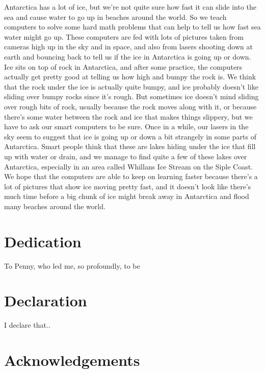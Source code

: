 \documentclass[12pt,twoside]{book}
\begin{document}
Antarctica has a lot of ice, but we're not quite sure how fast it can slide into the sea and cause water to go up in beaches around the world.
So we teach computers to solve some hard math problems that can help to tell us how fast sea water might go up.
These computers are fed with lots of pictures taken from cameras high up in the sky and in space, and also from lasers shooting down at earth and bouncing back to tell us if the ice in Antarctica is going up or down.
Ice sits on top of rock in Antarctica, and after some practice, the computers actually get pretty good at telling us how high and bumpy the rock is.
We think that the rock under the ice is actually quite bumpy, and ice probably doesn't like sliding over bumpy rocks since it's rough.
But sometimes ice doesn't mind sliding over rough bits of rock, usually because the rock moves along with it, or because there's some water between the rock and ice that makes things slippery, but we have to ask our smart computers to be sure.
Once in a while, our lasers in the sky seem to suggest that ice is going up or down a bit strangely in some parts of Antarctica.
Smart people think that these are lakes hiding under the ice that fill up with water or drain, and we manage to find quite a few of these lakes over Antarctica, especially in an area called Whillans Ice Stream on the Siple Coast.
We hope that the computers are able to keep on learning faster because there's a lot of pictures that show ice moving pretty fast, and it doesn't look like there's much time before a big chunk of ice might break away in Antarctica and flood many beaches around the world.

\chapter*{Dedication}
To Penny, who led me, so profoundly, to be

\chapter*{Declaration}
I declare that..

\chapter*{Acknowledgements}
\end{document}
